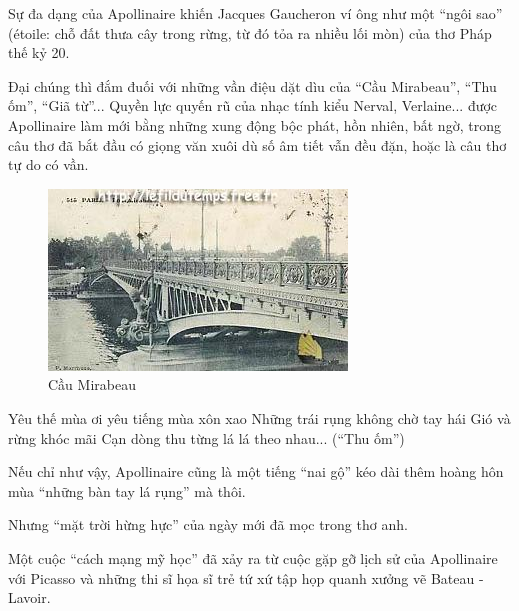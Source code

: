 \documentclass[../main.tex]{subfiles}
\begin{document}
\begin{multicols}{2}
Sự đa dạng của Apollinaire khiến Jacques Gaucheron ví ông như một “ngôi sao” (étoile: chỗ đất thưa cây trong rừng, từ đó tỏa ra nhiều lối mòn) của thơ Pháp thế kỷ 20. 
 
 Đại chúng thì đắm đuối với những vần điệu dặt dìu của “Cầu Mirabeau”, “Thu ốm”, “Giã từ”... Quyền lực quyến rũ của nhạc tính kiểu Nerval, Verlaine... được Apollinaire làm mới bằng những xung động bộc phát, hồn nhiên, bất ngờ, trong câu thơ đã bắt đầu có giọng văn xuôi dù số âm tiết vẫn đều đặn, hoặc là câu thơ tự do có vần. 

 \begin{figure}
	\centering
	\includegraphics[width=\textwidth]{../img/tho070808_2.jpg}
	\caption{Cầu Mirabeau}
\end{figure}
 \begin{blockquote}
        
Yêu thế mùa ơi yêu tiếng mùa xôn xao        
Những trái rụng không chờ tay hái	        
Gió và rừng khóc mãi        
Cạn dòng thu từng lá lá theo nhau... 
	(“Thu ốm”) 
 \end{blockquote}
 
Nếu chỉ như vậy, Apollinaire cũng là một tiếng “nai gộ” kéo dài thêm hoàng hôn mùa “những bàn tay lá rụng” mà thôi. 
 
Nhưng “mặt trời hừng hực” của ngày mới đã mọc trong thơ anh. 
 
Một cuộc “cách mạng mỹ học” đã xảy ra từ cuộc gặp gỡ lịch sử của Apollinaire với Picasso và những thi sĩ họa sĩ trẻ tứ xứ tập họp quanh xưởng vẽ Bateau - Lavoir. 
 

\end{multicols}
\end{document}

